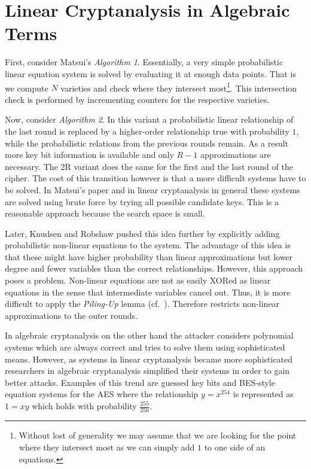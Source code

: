 \section{Linear Cryptanalysis in Algebraic Terms}
First, consider Matsui's \emph{Algorithm 1}. Essentially, a very simple probabilistic linear equation system is solved by evaluating it at enough data points. That is we compute $N$ varieties and check where they intersect most\footnote{Without lost of generality we may assume that we are looking for the point where they intersect most as we can simply add $1$ to one side of an equations.}. This intersection check is performed by incrementing counters for the respective varieties. 

Now, consider \emph{Algorithm 2}. In this variant a probabilistic linear relationship of the last round is replaced by a higher-order relationship true with probability $1$, while the probabilistic relations from the previous rounds remain. As a result more key bit information is available and only $R-1$ approximations are necessary. The 2R variant does the same for the first and the last round of the cipher. The cost of this transition however is that a more difficult systems have to be solved. In Matsui's paper and in linear cryptanalysis in general these systems are solved using brute force by trying all possible candidate keys. This is a reasonable approach because the search space is small.

Later, Knudsen and Robshaw \cite{Knudsen1996} pushed this idea further by explicitly adding probabilistic non-linear equations to the system. The advantage of this idea is that these might have higher probability than linear approximations but lower degree and fewer variables than the correct relationships. However, this approach poses a problem. Non-linear equations are not as easily XORed as linear equations in the sense that intermediate variables cancel out. Thus, it is more difficult to apply the \emph{Piling-Up} lemma (cf.~\cite{Heys2002}). Therefore \cite{Knudsen1996} restricts non-linear approximations to the outer rounds.

In algebraic cryptanalysis on the other hand the attacker considers polynomial systems which are always correct and tries to solve them using sophisticated means. However, as systems in linear cryptanalysis became more sophisticated researchers in algebraic cryptanalysis simplified their systems in order to gain better attacks. Examples of this trend are guessed key bits and BES-style equation systems for the AES \cite{murphy-robshaw:crypto2002} where the relationship $y = x^{254}$ is represented as $1 = xy$ which holds with probability $\frac{255}{256}$.

